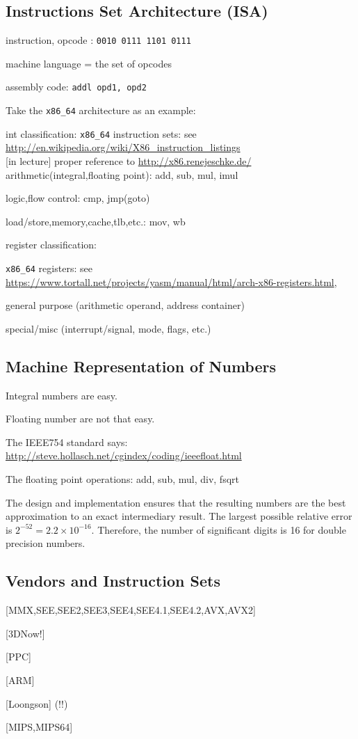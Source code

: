 \documentclass[main]{subfiles}
\begin{document}
\subsection{Instructions Set Architecture (ISA)}
instruction, opcode : \texttt{0010 0111 1101 0111}

machine language = the set of opcodes

assembly code: \texttt{addl opd1, opd2}

Take the \texttt{x86\_64} architecture as an example:

int classification:
\texttt{x86\_64} instruction sets: see \\
\url{http://en.wikipedia.org/wiki/X86_instruction_listings} \\

[in lecture] proper reference to \url{http://x86.renejeschke.de/} \\


arithmetic(integral,floating point): add, sub, mul, imul

logic,flow control: cmp, jmp(goto)

load/store,memory,cache,tlb,etc.: mov, wb


register classification:

\texttt{x86\_64} registers: see \\
\url{https://www.tortall.net/projects/yasm/manual/html/arch-x86-registers.html},

general purpose (arithmetic operand, address container)

special/misc (interrupt/signal, mode, flags, etc.) 

\subsection{Machine Representation of Numbers}
Integral numbers are easy.

Floating number are not that easy.

The IEEE754 standard says: \\
\url{http://steve.hollasch.net/cgindex/coding/ieeefloat.html}

The floating point operations: add, sub, mul, div, fsqrt

The design and implementation ensures that the resulting numbers are the best
approximation to an exact intermediary result. The largest possible relative 
error is $2^{-52}=2.2\times10^{-16}$. Therefore, the number of significant
digits is 16 for double precision numbers.


\subsection{Vendors and Instruction Sets}
[MMX,SEE,SEE2,SEE3,SEE4,SEE4.1,SEE4.2,AVX,AVX2]

[3DNow!]

[PPC]

[ARM]

[Loongson] (!!)

[MIPS,MIPS64]

\end{document}
